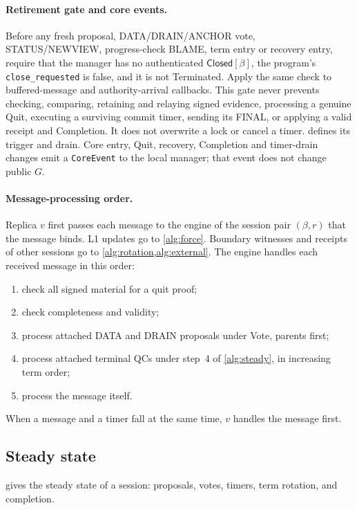 \documentclass[11pt,a4paper]{article}
\newcommand{\RR}[1]{{\color{rrRed}#1}}
\newcommand{\tagg}[1]{\ensuremath{\mathsf{#1}}}
\begin{document}
\paragraph{Retirement gate and core events.}
Before any fresh proposal, DATA/DRAIN/ANCHOR vote, STATUS/NEWVIEW,
progress-check BLAME, term entry or recovery entry, require that
the manager has no authenticated $\tagg{Closed}[\beta]$, the program's
\texttt{close\_requested} is false, and it is not Terminated.
Apply the same check to buffered-message and authority-arrival callbacks.
This gate never prevents checking, comparing, retaining and relaying
signed evidence, processing a genuine Quit, executing a surviving commit
timer, sending its FINAL, or applying a valid receipt and Completion.
It does not overwrite a lock or cancel a timer. 
defines its trigger and drain. Core entry, Quit, recovery, Completion
and timer-drain changes emit a \texttt{CoreEvent} to the local manager;
that event does not change public $G$.

\paragraph{Message-processing order.}\leavevmode
\RR{Replica $v$ first passes each message to the engine of the session
pair $(\beta,r)$ that the message binds. L1 updates go to \cref{alg:force}. Boundary witnesses and receipts of
other sessions go to \cref{alg:rotation,alg:external}.} The engine handles each received
message in this order:
\begin{enumerate}[label=(\arabic*)]
\item check all signed material for a quit proof;
\item check completeness and validity;
\item process attached DATA \RR{and DRAIN} proposals under Vote, parents
first;
\item process attached terminal QCs under step~4 of \cref{alg:steady},
in increasing term order;
\item process the message itself.
\end{enumerate}
When a message and a timer fall at the same time, $v$ handles the
message first.

\subsection{Steady state}
\label{sec:steady}
 gives the steady state of a session: proposals, votes,
timers, term rotation, and completion.
\end{document}
